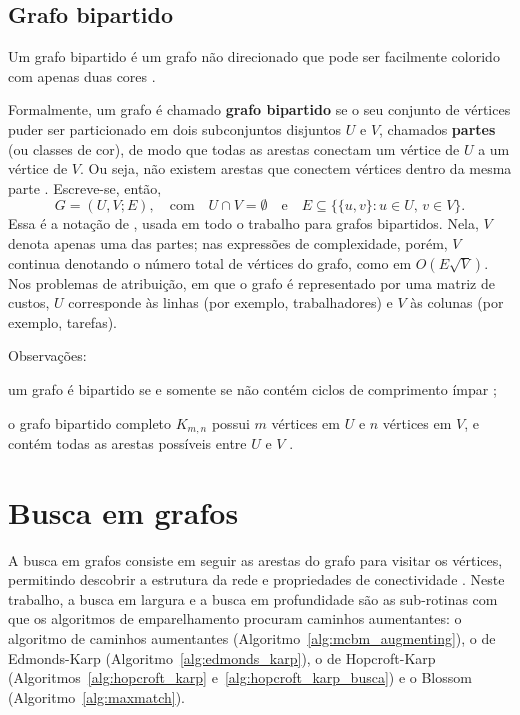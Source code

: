 \subsection{Grafo bipartido}

Um grafo bipartido é um grafo não direcionado que pode ser facilmente colorido com apenas duas cores \cite{manber}.

Formalmente, um grafo é chamado \textbf{grafo bipartido} se o seu conjunto de vértices puder ser
particionado em dois subconjuntos disjuntos $U$ e $V$, chamados \textbf{partes} (ou classes de cor), de modo que
todas as arestas conectam um vértice de $U$ a um vértice de $V$. Ou seja, não existem arestas que conectem
vértices dentro da mesma parte \cite{dasgupta}. Escreve-se, então,
\begin{equation}
    G = (U, V; E), \quad \text{com} \quad U \cap V = \emptyset \quad \text{e} \quad E \subseteq \{\{u, v\} : u \in U, \, v \in V\}.
\end{equation}
Essa é a notação de , usada em todo o trabalho para grafos bipartidos. Nela, $V$ denota apenas uma das partes; nas expressões de complexidade, porém, $V$ continua denotando o número total de vértices do grafo, como em $O(E\sqrt{V})$. Nos problemas de atribuição, em que o grafo é representado por uma matriz de custos, $U$ corresponde às linhas (por exemplo, trabalhadores) e $V$ às colunas (por exemplo, tarefas).

Observações:
\begin{alineas}
    \item um grafo é bipartido se e somente se não contém ciclos de comprimento ímpar \cite{schrijver};
    \item o grafo bipartido completo $K_{m,n}$ possui $m$ vértices em $U$ e $n$ vértices em $V$, 
    e contém todas as arestas possíveis entre $U$ e $V$ \cite{jungnickel}.
\end{alineas}



\section{Busca em grafos}

A busca em grafos consiste em seguir as arestas do grafo para visitar os vértices, permitindo descobrir a estrutura da rede e propriedades de conectividade \cite{cormen}. Neste trabalho, a busca em largura e a busca em profundidade são as sub-rotinas com que os algoritmos de emparelhamento procuram caminhos aumentantes: o algoritmo de caminhos aumentantes (Algoritmo~\ref{alg:mcbm_augmenting}), o de Edmonds-Karp (Algoritmo~\ref{alg:edmonds_karp}), o de Hopcroft-Karp (Algoritmos~\ref{alg:hopcroft_karp} e~\ref{alg:hopcroft_karp_busca}) e o Blossom (Algoritmo~\ref{alg:maxmatch}).


